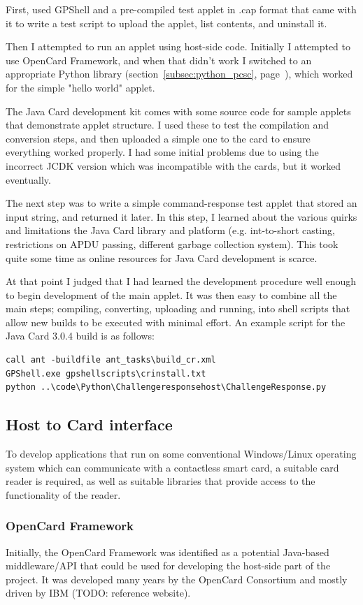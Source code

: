 \documentclass[12pt]{article}
\begin{document}
First, used GPShell and a pre-compiled test applet in .cap format that came with it to write a test script to upload the applet, list contents, and  uninstall it.

Then I attempted to run an applet using host-side code. Initially I attempted to use OpenCard Framework, and when that didn't work I switched to an appropriate Python library (section~\ref{subsec:python_pcsc}, page~\pageref{subsec:python_pcsc}), which worked for the simple "hello world" applet.

The Java Card development kit comes with some source code for sample applets that demonstrate applet structure. I used these to test the compilation and conversion steps, and then uploaded a simple one to the card to ensure everything worked properly. I had some initial problems due to using the incorrect JCDK version which was incompatible with the cards, but it worked eventually.

The next step was to write a simple command-response test applet that stored an input string, and returned it later. In this step, I learned about the various quirks and limitations the Java Card library and platform (e.g. int-to-short casting, restrictions on APDU passing, different garbage collection system). This took quite some time as online resources for Java Card development is scarce.

At that point I judged that I had learned the development procedure well enough to begin development of the main applet. It was then easy to combine all the main steps; compiling, converting, uploading and running, into shell scripts that allow new builds to be executed with minimal effort. An example script for the Java Card 3.0.4 build is as follows:
\begin{verbatim}
call ant -buildfile ant_tasks\build_cr.xml
GPShell.exe gpshellscripts\crinstall.txt
python ..\code\Python\Challengeresponsehost\ChallengeResponse.py
\end{verbatim}

\subsection{Host to Card interface}
To develop applications that run on some conventional Windows/Linux operating system which can communicate with a contactless smart card, a suitable card reader is required, as well as suitable libraries that provide access to the functionality of the reader.

\subsubsection{OpenCard Framework}
Initially, the OpenCard Framework was identified as a potential Java-based middleware/API that could be used for developing the host-side part of the project. It was developed many years by the OpenCard Consortium and mostly driven by IBM (TODO: reference website).
\end{document}
